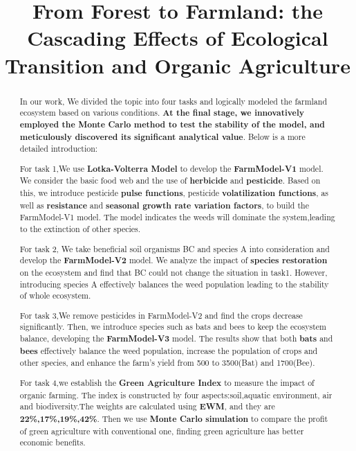 \documentclass[12pt]{article}  %
\title{From Forest to Farmland: the Cascading Effects of Ecological Transition and Organic Agriculture}  %
\begin{document}
\begin{abstract}
    In our work, We divided the topic into four tasks and logically modeled 
    the farmland ecosystem based 
    on various conditions. \textbf{At the final stage, we innovatively employed 
    the Monte Carlo method to test the stability of the model, and meticulously 
    discovered its significant analytical value}. Below is a more detailed 
    introduction:

For task 1,We use \textbf{Lotka-Volterra Model} to develop the \textbf{FarmModel-V1} model. 
We consider the basic food web and the use of \textbf{herbicide} and \textbf{pesticide}. 
Based on this, we introduce pesticide \textbf{pulse functions}, pesticide 
\textbf{volatilization functions}, as well as \textbf{resistance} and \textbf{seasonal growth 
rate variation factors}, to build the FarmModel-V1 model. The model 
indicates the weeds will dominate the system,leading to the extinction
 of other species.

For task 2, We take beneficial soil organisms BC and species A into 
consideration and develop the \textbf{FarmModel-V2} model. We analyze the impact 
of \textbf{species restoration} on the ecosystem and find that BC could not change
 the situation in task1. However, introducing species A effectively 
 balances the weed population leading to the stability of whole ecosystem.

For task 3,We remove pesticides in FarmModel-V2 and find the crops decrease 
significantly. Then, we introduce  species such as bats and bees to
 keep the ecosystem balance, developing the \textbf{FarmModel-V3} model. The 
 results show that both \textbf{bats} and \textbf{bees} effectively balance the weed 
 population, increase the population of crops and other species, and 
 enhance the farm's yield from 500 to 3500(Bat) and 1700(Bee).

For task 4,we establish the \textbf{Green Agriculture Index} to measure the 
impact of organic farming. The index is constructed by four 
aspects:soil,aquatic environment, air and biodiversity.The 
weights are calculated using \textbf{EWM}, and they are \textbf{22\%,17\%,19\%,42\%}.
Then we use \textbf{Monte Carlo simulation} to compare the profit of green 
agriculture with conventional one, finding green agriculture has
 better economic benefits.


\end{abstract}
\end{document}
